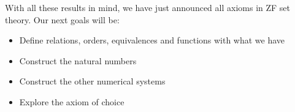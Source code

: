 \documentclass{tufte-handout}
\begin{document}
With all these results in mind, we have just announced all axioms in ZF set theory. Our next goals will be:
\begin{itemize}
	\item Define relations, orders, equivalences and functions with what we have
	\item Construct the natural numbers
	\item Construct the other numerical systems
	\item Explore the axiom of choice
\end{itemize}
\end{document}
